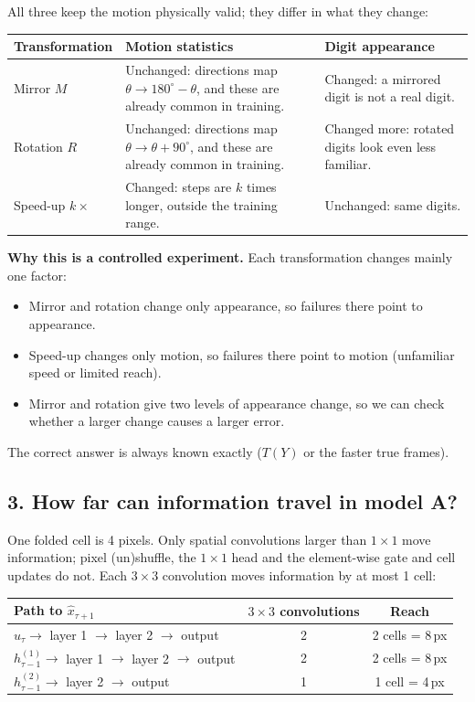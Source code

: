 \documentclass[11pt, a4paper]{article}
\begin{document}
All three keep the motion physically valid; they differ in what they change:

\begin{center}
\begin{tabularx}{\textwidth}{@{}l >{\raggedright\arraybackslash}X >{\raggedright\arraybackslash}X@{}}
\toprule
Transformation & Motion statistics & Digit appearance \\
\midrule
Mirror $M$ & Unchanged: directions map $\theta \to 180^\circ-\theta$, and these are already common in training. & Changed: a mirrored digit is not a real digit. \\
Rotation $R$ & Unchanged: directions map $\theta \to \theta+90^\circ$, and these are already common in training. & Changed more: rotated digits look even less familiar. \\
Speed-up $k\times$ & Changed: steps are $k$ times longer, outside the training range. & Unchanged: same digits. \\
\bottomrule
\end{tabularx}
\end{center}

\textbf{Why this is a controlled experiment.} Each transformation changes mainly one factor:
\begin{itemize}[itemsep=0pt]
  \item Mirror and rotation change only appearance, so failures there point to appearance.
  \item Speed-up changes only motion, so failures there point to motion (unfamiliar speed or limited reach).
  \item Mirror and rotation give two levels of appearance change, so we can check whether a larger change causes a larger error.
\end{itemize}
The correct answer is always known exactly ($T(Y)$ or the faster true frames).

\subsection*{3. How far can information travel in model A?}

One folded cell is 4 pixels. Only spatial convolutions larger than $1\times1$ move information; pixel (un)shuffle, the $1\times1$ head and the element-wise gate and cell updates do not. Each $3\times3$ convolution moves information by at most 1 cell:

\begin{center}
\begin{tabular}{lcc}
\toprule
Path to $\hat{x}_{\tau+1}$ & $3 \times 3$ convolutions & Reach \\
\midrule
$u_\tau \to$ layer 1 $\to$ layer 2 $\to$ output & 2 & 2 cells = 8\,px \\
$h^{(1)}_{\tau-1} \to$ layer 1 $\to$ layer 2 $\to$ output & 2 & 2 cells = 8\,px \\
$h^{(2)}_{\tau-1} \to$ layer 2 $\to$ output & 1 & 1 cell = 4\,px \\
\bottomrule
\end{tabular}
\end{center}
\end{document}
